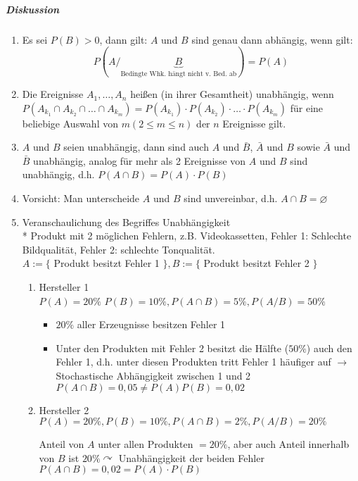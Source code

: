 \documentclass[a4paper]{scrartcl}
\begin{document}
\subparagraph{Diskussion}
\begin{enumerate}
\item Es sei $P(B) > 0$, dann gilt: $A$ und $B$ sind genau dann abhängig, wenn gilt:
\[ P(A / \underbrace{B}_{\text{Bedingte Whk. hängt nicht v. Bed. ab}}) = P(A) \]
\item Die Ereignisse $A_1,\dots,A_n$ heißen (in ihrer Gesamtheit) unabhängig, wenn $P(A_{k_1} \cap A_{k_2} \cap \dots \cap A_{k_m} ) = P(A_{k_1} ) \cdot P(A_{k_2}) \cdot \dots \cdot P (A_{k_m})$ für eine beliebige Auswahl von $m(2 \leq m \leq n)$ der $n$ Ereignisse gilt.
\item $A$ und $B$ seien unabhängig, dann sind auch $A$ und $\bar{B}$, $\bar{A}$ und $B$ sowie $\bar{A}$ und $\bar{B}$ unabhängig, analog für mehr als 2 Ereignisse von $A$ und $B$ sind unabhängig, d.h. $P(A\cap B) = P(A) \cdot P(B)$
\item Vorsicht: Man unterscheide $A$ und $B$ sind unvereinbar, d.h. $A \cap B = \varnothing$
\item Veranschaulichung des Begriffes Unabhängigkeit\\*
Produkt mit 2 möglichen Fehlern, z.B. Videokassetten, Fehler 1: Schlechte Bildqualität, Fehler 2: schlechte Tonqualität.\\
$A:=\{$ Produkt besitzt Fehler 1 $\}, B:= \{$ Produkt besitzt Fehler 2 $\}$
\begin{enumerate}
\item Hersteller 1\\
$P(A) = 20 \% $ 
$P(B) = 10\%, P(A \cap B) = 5 \% , P(A / B) = 50 \%$
\begin{itemize}
\item $20\% $ aller Erzeugnisse besitzen Fehler 1
\item Unter den Produkten mit Fehler 2 besitzt die Hälfte ($50\%$) auch den Fehler 1, d.h. unter diesen Produkten tritt Fehler 1 häufiger auf $\rightarrow$ Stochastische Abhängigkeit zwischen 1 und 2\\
$P(A\cap B) = 0,05 \neq P(A) P(B) = 0,02$
\end{itemize}
\item Hersteller 2\\
$P(A) = 20 \%, P(B) = 10 \% , P(A\cap B) = 2 \%, P(A / B) = 20 \%$

Anteil von $A$ unter allen Produkten $= 20 \%$, aber auch Anteil innerhalb von $B$ ist $20\% \curvearrowright$ Unabhängigkeit der beiden Fehler\\
$P(A \cap B) = 0,02 = P(A) \cdot P(B)$
\end{enumerate}
\end{enumerate}
\end{document}
